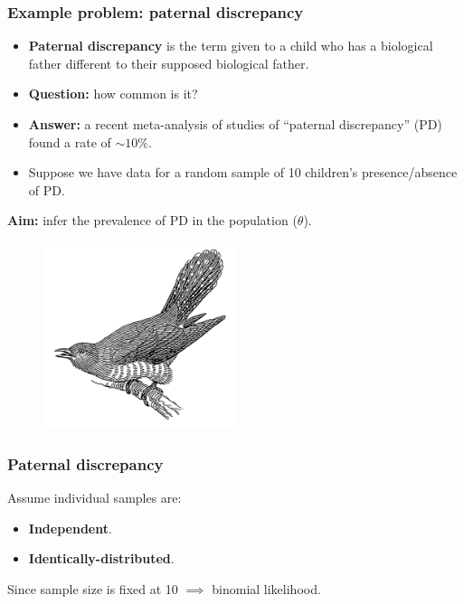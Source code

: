 \documentclass[handout]{beamer}
\begin{document}
\begin{frame}
	\frametitle{Example problem: paternal discrepancy}
	
	\begin{itemize}
		\item<2-> \textbf{Paternal discrepancy} is the term given to a child who has a biological father different to their supposed biological father.
		\item<3-> \textbf{Question:} how common is it?
		\item<4-> \textbf{Answer:} a recent meta-analysis of studies of ``paternal discrepancy'' (PD) found a rate of $\sim 10\%$.
		\item<5-> Suppose we have data for a random sample of 10 children's presence/absence of PD.
	\end{itemize}
	
	 \textbf{Aim:} infer the prevalence of PD in the population ($\theta$).
	
	\begin{figure}[ht]
		\includegraphics[width=0.5\textwidth]{./Animations/cuckoo.png}
	\end{figure}
	
\end{frame}

\begin{frame}
	\frametitle{Paternal discrepancy}
	Assume individual samples are:
	
	\begin{itemize}
		\item<2-> \textbf{Independent}.
		\item<3-> \textbf{Identically-distributed}.
	\end{itemize}
	
	Since sample size is fixed at 10 $\implies$ binomial likelihood.
	
\end{frame}
\end{document}
